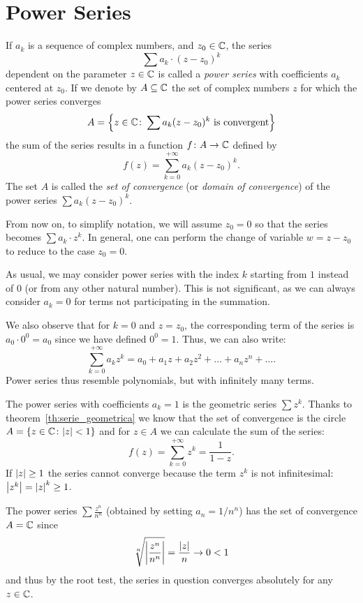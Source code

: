 \section{Power Series}

If $a_k$ is a sequence of complex numbers, and $z_0\in {\mathbb C}$, 
the series
\[
 \sum a_k \cdot (z-z_0)^k
\]
dependent on the parameter $z\in {\mathbb C}$ is called a
\emph{power series}%
%
with coefficients $a_k$ centered at $z_0$.
If we denote by $A\subseteq {\mathbb C}$ the set of complex numbers $z$
for which the power series converges
\[
A= {\left\{ z\in {\mathbb C} \colon \sum a_k (z-z_0)^k \text{ is convergent} \right\}}
\]
the sum of the series results in a function
$f \colon A \to {\mathbb C}$ defined by
\[
  f(z) = \sum_{k=0}^{+\infty} a_k (z-z_0)^k.
\]
The set $A$ is called the \emph{set of convergence}%
%
(or \emph{domain of convergence}) of the power series $\sum a_k (z-z_0)^k$.

From now on, to simplify notation, 
we will assume $z_0=0$ so that 
the series becomes $\sum a_k \cdot z^k$. 
In general, one can perform the change of variable $w=z-z_0$ 
to reduce to the case $z_0=0$.

As usual, we may consider power series
with the index $k$ starting from $1$ instead of $0$
(or from any other natural number).
This is not significant, as we can always consider $a_k=0$ for terms
not participating in the summation.

We also observe that for $k=0$ and $z=z_0$, 
the corresponding term of the series is
$a_0 \cdot 0^0 = a_0$ since we have defined $0^0=1$. Thus, we can also write:
\[
  \sum_{k=0}^{+\infty} a_k z^k = a_0 + a_1 z + a_2 z^2 + \dots + a_n z^n + \dots.
\]
Power series thus resemble polynomials, but with infinitely many terms.

\begin{example}
The power series with coefficients $a_k=1$ is the
geometric series $\sum z^k$.
Thanks to theorem~\ref{th:serie_geometrica} 
we know that the set of convergence is the circle
$A={\left\{ z\in {\mathbb C} \colon {\left|z\right|}<1 \right\}}$
and for $z\in A$ we can calculate the sum of the series:
\[
 f(z) = \sum_{k=0}^{+\infty} z^k  = \frac{1}{1-z}.
\]
If ${\left|z\right|}\ge 1$ the series cannot converge because the term $z^k$ is not
infinitesimal: ${\left|z^k\right|} = {\left|z\right|}^k \ge 1$.
\end{example}

\begin{example}
\label{ex:477474}
The power series $\sum \frac{z^n}{n^n}$ (obtained by setting $a_n=1/n^n$)
has the set of convergence $A={\mathbb C}$
since
\[
\sqrt[n]{{\left|\frac{z^n}{n^n}\right|}} = \frac{{\left|z\right|}}{n} \to 0 < 1
\]
and thus by the root test, the series in question converges absolutely
for any $z\in {\mathbb C}$.
\end{example}

